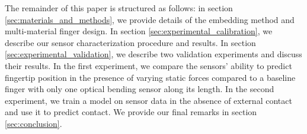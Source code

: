 The remainder of this paper is structured as follows: in section \ref{sec:materials_and_methods}, we provide details of the embedding method and multi-material finger design. In section \ref{sec:experimental_calibration}, we describe our sensor characterization procedure and results. In section \ref{sec:experimental_validation}, we describe two validation experiments and discuss their results. In the first experiment, we compare the sensors' ability to predict fingertip position in the presence of varying static forces compared to a baseline finger with only one optical bending sensor along its length. In the second experiment, we train a model on sensor data in the absence of external contact and use it to predict contact. We provide our final remarks in section \ref{sec:conclusion}. 